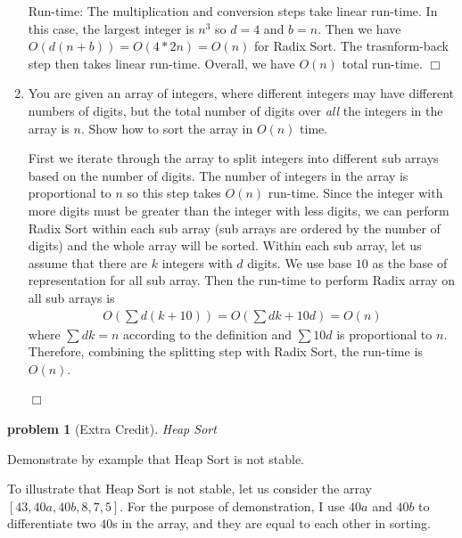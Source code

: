 \documentclass[10pt]{article}
\newenvironment{proof}{\par\noindent{\it Proof.}\hspace*{1em}}{$\Box$\bigskip}
\newtheorem{problem}{\sc\color{cit}problem}
\begin{document}
\begin{enumerate}
\begin{proof}
    Run-time: The multiplication and conversion steps take linear run-time. In this case, the largest integer is $n^3$ so $d=4$ and $b=n$. Then we have $O(d(n+b))=O(4*2n)=O(n)$ for Radix Sort. The trasnform-back step then takes linear run-time. Overall, we have $O(n)$ total run-time.
    \end{proof}
    \item You are given an array of integers, where different integers may have different numbers of digits, but the total number of digits over \emph{all} the integers in the array is $n$.  Show how to sort the array in $O(n)$ time.
    \begin{proof}
    First we iterate through the array to split integers into different sub arrays based on the number of digits. The number of integers in the array is proportional to $n$ so this step takes $O(n)$ run-time. Since the integer with more digits must be greater than the integer with less digits, we can perform Radix Sort within each sub array (sub arrays are ordered by the number of digits) and the whole array will be sorted. Within each sub array, let us assume that there are $k$ integers with $d$ digits. We use base $10$ as the base of representation for all sub array. Then the run-time to perform Radix array on all sub arrays is 
    \begin{align}
        O(\sum d(k+10))=O(\sum dk+10d)=O(n)
    \end{align}
    where $\sum dk = n$ according to the definition and $\sum 10d$ is proportional to $n$. Therefore, combining the splitting step with Radix Sort, the run-time is $O(n)$. 
    
    \end{proof}
\end{enumerate}

\vspace*{.25in} %
\begin{problem} [Extra Credit] Heap Sort \end{problem}
Demonstrate by example that Heap Sort is not stable.

To illustrate that Heap Sort is not stable, let us consider the array $[43, 40a, 40b, 8, 7, 5]$. For the purpose of demonstration, I use $40a$ and $40b$ to differentiate two $40$s in the array, and they are equal to each other in sorting. 
\end{document}
